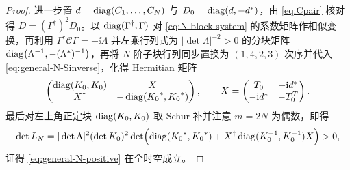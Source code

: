 \begin{proof}
进一步置 $d=\operatorname{diag}(C_1,\ldots,C_N)$ 与 $D_0=\operatorname{diag}(d,-{d}^{*})$，由 \eqref{eq:Cpair} 核对得 $D=(\Gamma^\dagger)^2D_0$。以 $\operatorname{diag}(\Gamma^\dagger,\Gamma)$ 对 \eqref{eq:N-block-system} 的系数矩阵作相似变换，再利用 $\Gamma^\dagger\mathcal C\Gamma=-\ii\Lambda$ 并左乘行列式为 $|\det\Lambda|^{-2}>0$ 的分块矩阵 $\operatorname{diag}\bigl(\Lambda^{-1},-({\Lambda}^{*})^{-1}\bigr)$，再将 $N$ 阶子块行列同步置换为 $(1,4,2,3)$ 次序并代入 \eqref{eq:general-N-Sinverse}，化得 Hermitian 矩阵
\begin{equation*}
\begin{pmatrix}\operatorname{diag}(K_0,K_0)&X\\X^\dagger&-\operatorname{diag}({K_0}^{*},{K_0}^{*})\end{pmatrix},\qquad
X=\begin{pmatrix}T_0&-\mathrm{i}{d}^{*}\\-\mathrm{i}{d}^{*}&-T_0^T\end{pmatrix}.
\end{equation*}
最后对左上角正定块 $\operatorname{diag}(K_0,K_0)$ 取 Schur 补并注意 $m=2N$ 为偶数，即得
\begin{equation*}
\det L_N=|\det\Lambda|^2(\det K_0)^2\det\Bigl(\operatorname{diag}({K_0}^{*},{K_0}^{*})+X^\dagger\operatorname{diag}(K_0^{-1},K_0^{-1})X\Bigr)>0,
\end{equation*}
证得 \eqref{eq:general-N-positive} 在全时空成立。
\end{proof}

